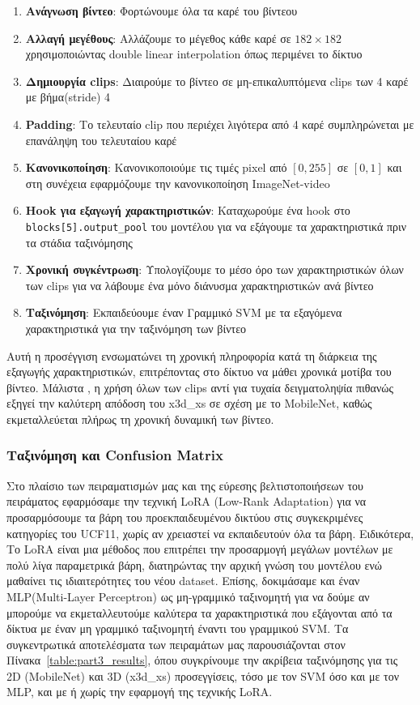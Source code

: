 \documentclass[12pt, a4paper]{article}
\begin{document}
\begin{enumerate}
    \item \textbf{Ανάγνωση βίντεο}: Φορτώνουμε όλα τα καρέ του βίντεου
    \item \textbf{Αλλαγή μεγέθους}: Αλλάζουμε το μέγεθος κάθε καρέ σε $182 \times 182$ χρησιμοποιώντας double linear interpolation όπως περιμένει το δίκτυο
    \item \textbf{Δημιουργία clips}: Διαιρούμε το βίντεο σε μη-επικαλυπτόμενα clips των 4 καρέ με βήμα(stride) 4
    \item \textbf{Padding}: Το τελευταίο clip που περιέχει λιγότερα από 4 καρέ συμπληρώνεται με επανάληψη του τελευταίου καρέ
    \item \textbf{Κανονικοποίηση}: Κανονικοποιούμε τις τιμές pixel από $[0, 255]$ σε $[0, 1]$ και στη συνέχεια εφαρμόζουμε την κανονικοποίηση ImageNet-video
    \item \textbf{Hook για εξαγωγή χαρακτηριστικών}: Καταχωρούμε ένα hook στο \texttt{blocks[5].output\_pool} του μοντέλου για να εξάγουμε τα χαρακτηριστικά πριν τα στάδια ταξινόμησης
    \item \textbf{Χρονική συγκέντρωση}: Υπολογίζουμε το μέσο όρο των χαρακτηριστικών όλων των clips για να λάβουμε ένα μόνο διάνυσμα χαρακτηριστικών ανά βίντεο
    \item \textbf{Ταξινόμηση}: Εκπαιδεύουμε έναν Γραμμικό SVM με τα εξαγόμενα χαρακτηριστικά για την ταξινόμηση των βίντεο

\end{enumerate}

Αυτή η προσέγγιση ενσωματώνει τη χρονική πληροφορία κατά τη διάρκεια της εξαγωγής χαρακτηριστικών, επιτρέποντας στο δίκτυο να μάθει χρονικά μοτίβα του βίντεο.
Μάλιστα , η χρήση όλων των clips αντί για τυχαία δειγματοληψία πιθανώς εξηγεί την καλύτερη απόδοση του x3d\_xs σε σχέση με το MobileNet, καθώς εκμεταλλεύεται πλήρως τη χρονική δυναμική των βίντεο.
\subsubsection{Ταξινόμηση και Confusion Matrix}


Στο πλαίσιο των πειραματισμών μας και της εύρεσης βελτιστοποιήσεων του πειράματος
εφαρμόσαμε την τεχνική LoRA (Low-Rank Adaptation) για να προσαρμόσουμε τα βάρη του προεκπαιδευμένου δικτύου στις συγκεκριμένες κατηγορίες του UCF11, χωρίς αν χρειαστεί να εκπαιδευτούν όλα τα βάρη. Ειδικότερα,
Το LoRA είναι μια μέθοδος που επιτρέπει την προσαρμογή μεγάλων μοντέλων με πολύ λίγα παραμετρικά βάρη, διατηρώντας την αρχική γνώση του μοντέλου ενώ μαθαίνει τις ιδιαιτερότητες του νέου dataset.
Επίσης, δοκιμάσαμε και έναν MLP(Multi-Layer Perceptron) ως μη-γραμμικό ταξινομητή για να δούμε αν μπορούμε να εκμεταλλευτούμε καλύτερα τα χαρακτηριστικά που εξάγονται από τα δίκτυα με έναν μη γραμμικό ταξινομητή έναντι του γραμμικού SVM.
Τα συγκεντρωτικά αποτελέσματα των πειραμάτων μας παρουσιάζονται στον Πίνακα~\ref{table:part3_results}, όπου συγκρίνουμε την ακρίβεια ταξινόμησης για τις 2D (MobileNet) και 3D (x3d\_xs) προσεγγίσεις, τόσο με τον SVM όσο και με τον MLP, και με ή χωρίς την εφαρμογή της τεχνικής LoRA.
\end{document}
